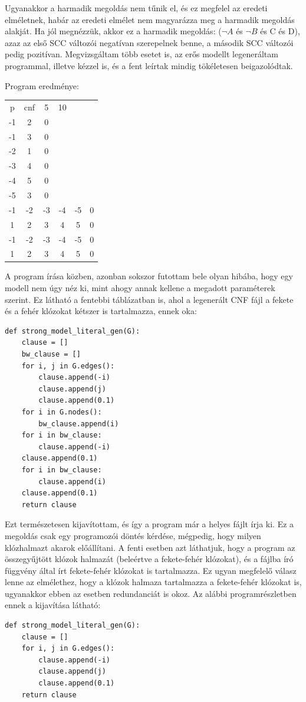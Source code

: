 \documentclass[
]{thesis-ekf}
\theoremstyle{definition}
\theoremstyle{remark}
\begin{document}
	Ugyanakkor a harmadik megoldás nem tűnik el, és ez megfelel az eredeti elméletnek, habár az eredeti elmélet nem magyarázza meg a harmadik megoldás alakját. Ha jól megnézzük, akkor ez a harmadik megoldás: ($ \neg A $ és $ \neg B $ és C és D), azaz az első \textsc{SCC} változói negatívan szerepelnek benne, a második \textsc{SCC} változói pedig pozitívan. Megvizsgáltam több esetet is, az erős modellt legeneráltam programmal, illetve kézzel is, és a fent leírtak mindig tökéletesen beigazolódtak.
	
	Program eredménye:
	
	\begin{tabular}{cccccc}
		p & cnf & 5 & 10 & &   \\
		-1&  2 &  0&   &   &   \\
		-1&  3 &  0&   &   &   \\
		-2&  1 &  0&   &   &   \\
		-3&  4 &  0&   &   &   \\
		-4&  5 &  0&   &   &   \\
		-5&  3 &  0&   &   &   \\
		-1& -2 & -3& -4& -5& 0 \\
		 1&  2 &  3&  4&  5& 0 \\
		-1& -2 & -3& -4& -5& 0 \\
		 1&  2 &  3&  4&  5& 0 \\
	\end{tabular}

	A program írása közben, azonban sokszor futottam bele olyan hibába, hogy egy modell nem úgy néz ki, mint ahogy annak kellene a megadott paraméterek szerint. Ez látható a fentebbi táblázatban is, ahol a  legenerált \textsc{CNF} fájl a fekete és a fehér klózokat kétszer is tartalmazza, ennek oka:
	
	\begin{lstlisting}
def strong_model_literal_gen(G):
	clause = []
	bw_clause = []
	for i, j in G.edges():
		clause.append(-i)
		clause.append(j)
		clause.append(0.1)
	for i in G.nodes():
		bw_clause.append(i)
	for i in bw_clause:
		clause.append(-i)
	clause.append(0.1)
	for i in bw_clause:
	 	clause.append(i)
	clause.append(0.1)
	return clause
	\end{lstlisting}
	
	Ezt természetesen kijavítottam, és így a program már a helyes fájlt írja ki. Ez a megoldás csak egy programozói döntés kérdése, mégpedig, hogy milyen klózhalmazt akarok előállítani. A fenti esetben azt láthatjuk, hogy a program az összegyűjtött klózok halmazát (beleértve a fekete-fehér klózokat), és a fájlba író függvény által írt fekete-fehér klózokat is tartalmazza. Ez ugyan megfelelő válasz lenne az elmélethez, hogy a klózok halmaza tartalmazza a fekete-fehér klózokat is, ugyanakkor ebben az esetben redundanciát is okoz. Az alábbi programrészletben ennek a kijavítása látható:
	\newpage
	\begin{lstlisting}
def strong_model_literal_gen(G):
	clause = []
	for i, j in G.edges():
		clause.append(-i)
		clause.append(j)
		clause.append(0.1)
	return clause	
	\end{lstlisting}
\end{document}
